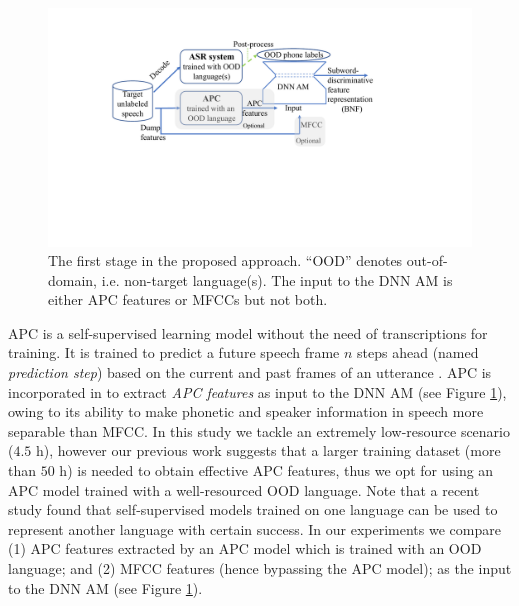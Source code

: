 \documentclass[a4paper]{article}
\begin{document}
\begin{figure}[!t]
    \centering
    \includegraphics[width =  \linewidth]{LaTeX/USM.pdf}
    \caption{The first stage in the proposed approach. ``OOD'' denotes out-of-domain, i.e. non-target language(s). The input to the DNN AM is either APC features or MFCCs but not both.}
    \label{fig:framework_1st}
\end{figure}

APC is a self-supervised learning model without the need of transcriptions for training. It is trained to predict a future speech frame $n$ steps ahead (named \textit{prediction step}) based on the current and past frames of an utterance \cite{Chung2019}. APC is incorporated in \cite{feng2020unsupervised} to extract \textit{APC features} as input to the DNN AM (see Figure \ref{fig:framework_1st}), owing to its ability to make phonetic and speaker information   in speech   more separable than  MFCC.  
In this study we tackle an extremely low-resource scenario ($4.5$ h), however
our previous work \cite{feng2020unsupervised} suggests that a larger training dataset (more than $50$ h) is needed to obtain effective APC features, thus we opt  for using an APC model trained with a well-resourced OOD language. Note that a recent study \cite{riviere2020unsupervised} found that self-supervised models trained on one language can be used to represent another language with certain success. In our experiments we compare (1)  APC features extracted by an APC model which is trained with an OOD language; and (2) MFCC features (hence bypassing the APC model); as the input  to the DNN AM (see Figure \ref{fig:framework_1st}). 
\end{document}
